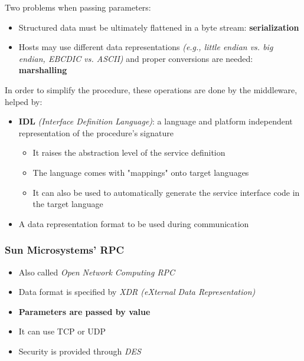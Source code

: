 Two problems when passing parameters:
\begin{itemize}
    \item Structured data must be ultimately flattened in a byte stream: \textbf{serialization}
    \item Hosts may use different data representations \textit{(e.g., little endian vs. big endian, EBCDIC vs. ASCII)} and proper conversions are needed: \textbf{marshalling}
\end{itemize}
In order to simplify the procedure, these operations are done by the middleware, helped by:

\begin{itemize}
    \item \textbf{IDL} \textit{(Interface Definition Language)}: a language and platform independent representation of the procedure's signature
    \begin{itemize}
        \item It raises the abstraction level of the service definition
        \item The language comes with "mappings" onto target languages
        \item It can also be used to automatically generate the service interface code in the target language 
    \end{itemize}
    \item A data representation format to be used during communication
\end{itemize}

\subsubsection{Sun Microsystems' RPC}
\begin{itemize}
    \item Also called \textit{Open Network Computing RPC}
    \item Data format is specified by \textit{XDR (eXternal Data Representation)}
    \item \textbf{Parameters are passed by value}
    \item It can use TCP or UDP
    \item Security is provided through \textit{DES}
\end{itemize}

